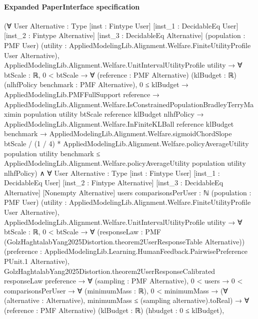 \documentclass[10pt]{article}
\begin{document}
\paragraph{Expanded PaperInterface specification}
\begin{ReviewVerbatim}
(∀ {User Alternative : Type} [inst : Fintype User] [inst_1 : DecidableEq User] [inst_2 : Fintype Alternative]
    [inst_3 : DecidableEq Alternative] (population : PMF User)
    (utility : AppliedModelingLib.Alignment.Welfare.FiniteUtilityProfile User Alternative),
    AppliedModelingLib.Alignment.Welfare.UnitIntervalUtilityProfile utility →
      ∀ {btScale : ℝ},
        0 < btScale →
          ∀ (reference : PMF Alternative) (klBudget : ℝ) (nlhfPolicy benchmark : PMF Alternative),
            0 ≤ klBudget →
              AppliedModelingLib.PMFFullSupport reference →
                AppliedModelingLib.Alignment.Welfare.IsConstrainedPopulationBradleyTerryMaximin population utility
                    btScale reference klBudget nlhfPolicy →
                  AppliedModelingLib.Alignment.Welfare.InFiniteKLBall reference klBudget benchmark →
                    AppliedModelingLib.Alignment.Welfare.sigmoidChordSlope btScale / (1 / 4) *
                        AppliedModelingLib.Alignment.Welfare.policyAverageUtility population utility benchmark ≤
                      AppliedModelingLib.Alignment.Welfare.policyAverageUtility population utility nlhfPolicy) ∧
  ∀ {User Alternative : Type} [inst : Fintype User] [inst_1 : DecidableEq User] [inst_2 : Fintype Alternative]
    [inst_3 : DecidableEq Alternative] [Nonempty Alternative] {users comparisonsPerUser : ℕ} (population : PMF User)
    (utility : AppliedModelingLib.Alignment.Welfare.FiniteUtilityProfile User Alternative),
    AppliedModelingLib.Alignment.Welfare.UnitIntervalUtilityProfile utility →
      ∀ {btScale : ℝ},
        0 < btScale →
          ∀ (responseLaw : PMF (GolzHaghtalabYang2025Distortion.theorem2UserResponseTable Alternative))
            (preference : AppliedModelingLib.Learning.HumanFeedback.PairwisePreference PUnit.{1} Alternative),
            GolzHaghtalabYang2025Distortion.theorem2UserResponseCalibrated responseLaw preference →
              ∀ (sampling : PMF Alternative),
                0 < users →
                  0 < comparisonsPerUser →
                    ∀ (minimumMass : ℝ),
                      0 < minimumMass →
                        (∀ (alternative : Alternative), minimumMass ≤ (sampling alternative).toReal) →
                          ∀ (reference : PMF Alternative) (klBudget : ℝ) (hbudget : 0 ≤ klBudget),

\end{ReviewVerbatim}
\end{document}
